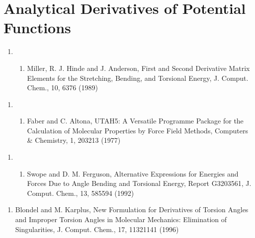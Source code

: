 \documentclass[letterpaper,11pt,english]{sphinxmanual}
\begin{document}
\section{Analytical Derivatives of Potential Functions}
\label{\detokenize{text/references:analytical-derivatives-of-potential-functions}}\begin{enumerate}
%
\setcounter{enumi}{10}
\item {} \begin{enumerate}
%
\setcounter{enumii}{9}
\item {} 
Miller, R. J. Hinde and J. Anderson, First and Second Derivative Matrix Elements for the Stretching, Bending, and Torsional Energy, J. Comput. Chem., 10, 63\sphinxhyphen{}76 (1989)

\end{enumerate}

\end{enumerate}
\begin{enumerate}
%
\setcounter{enumi}{3}
\item {} \begin{enumerate}
%
\setcounter{enumii}{7}
\item {} 
Faber and C. Altona, UTAH5: A Versatile Programme Package for the Calculation of Molecular Properties by Force Field Methods, Computers \& Chemistry, 1, 203\sphinxhyphen{}213 (1977)

\end{enumerate}

\end{enumerate}
\begin{enumerate}
%
\setcounter{enumi}{22}
\item {} \begin{enumerate}
%
\setcounter{enumii}{2}
\item {} 
Swope and D. M. Ferguson, Alternative Expressions for Energies and Forces Due to Angle Bending and Torsional Energy, Report G320\sphinxhyphen{}3561, J. Comput. Chem., 13, 585\sphinxhyphen{}594 (1992)

\end{enumerate}

\end{enumerate}
\begin{enumerate}
%
\item {} 
Blondel and M. Karplus, New Formulation for Derivatives of Torsion Angles and Improper Torsion Angles in Molecular Mechanics: Elimination of Singularities, J. Comput. Chem., 17, 1132\sphinxhyphen{}1141 (1996)

\end{enumerate}
\end{document}
